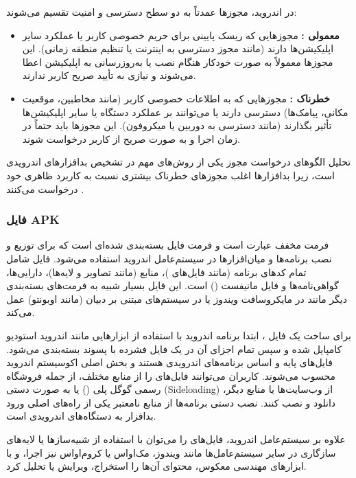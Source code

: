در اندروید، مجوزها عمدتاً به دو سطح دسترسی و امنیت تقسیم می‌شوند:
\begin{itemize}
    \item \textbf{معمولی :} مجوزهایی که ریسک پایینی برای حریم خصوصی کاربر یا عملکرد سایر اپلیکیشن‌ها دارند (مانند مجوز دسترسی به اینترنت یا تنظیم منطقه زمانی). این مجوزها معمولاً به صورت خودکار هنگام نصب یا به‌روزرسانی به اپلیکیشن اعطا می‌شوند و نیازی به تأیید صریح کاربر ندارند.
    \item \textbf{خطرناک :} مجوزهایی که به اطلاعات خصوصی کاربر (مانند مخاطبین، موقعیت مکانی، پیامک‌ها) دسترسی دارند یا می‌توانند بر عملکرد دستگاه یا سایر اپلیکیشن‌ها تأثیر بگذارند (مانند دسترسی به دوربین یا میکروفون). این مجوزها باید حتماً در زمان اجرا و به صورت صریح از کاربر درخواست شوند.
\end{itemize}
تحلیل الگوهای درخواست مجوز یکی از روش‌های مهم در تشخیص بدافزارهای اندرویدی است، زیرا بدافزارها اغلب مجوزهای خطرناک بیشتری نسبت به کاربرد ظاهری خود درخواست می‌کنند \cite{Drebin}.

\subsubsection{فایل APK}
فرمت  مخفف عبارت  است و فرمت فایل بسته‌بندی شده‌ای است که برای توزیع و نصب برنامه‌ها و میان‌افزارها در سیستم‌عامل اندروید استفاده می‌شود. فایل  شامل تمام کدهای برنامه (مانند فایل‌های )، منابع (مانند تصاویر و لایه‌ها)، دارایی‌ها، گواهی‌نامه‌ها و فایل مانیفست () است. این فایل بسیار شبیه به فرمت‌های بسته‌بندی دیگر مانند  در مایکروسافت ویندوز یا  در سیستم‌های مبتنی بر دبیان (مانند اوبونتو) عمل می‌کند.

برای ساخت یک فایل ، ابتدا برنامه اندروید با استفاده از ابزارهایی مانند اندروید استودیو کامپایل شده و سپس تمام اجزای آن در یک فایل فشرده با پسوند  بسته‌بندی می‌شود. فایل‌های  پایه و اساس برنامه‌های اندرویدی هستند و بخش اصلی اکوسیستم اندروید محسوب می‌شوند. کاربران می‌توانند فایل‌های  را از منابع مختلف، از جمله فروشگاه رسمی گوگل پلی () یا به صورت دستی (Sideloading) از وب‌سایت‌ها یا منابع دیگر، دانلود و نصب کنند. نصب دستی برنامه‌ها از منابع نامعتبر یکی از راه‌های اصلی ورود بدافزار به دستگاه‌های اندرویدی است.

علاوه بر سیستم‌عامل اندروید، فایل‌های  را می‌توان با استفاده از شبیه‌سازها یا لایه‌های سازگاری در سایر سیستم‌عامل‌ها مانند ویندوز، مک‌اواس یا کروم‌اواس نیز اجرا، و با ابزارهای مهندسی معکوس، محتوای آن‌ها را استخراج، ویرایش یا تحلیل کرد.

